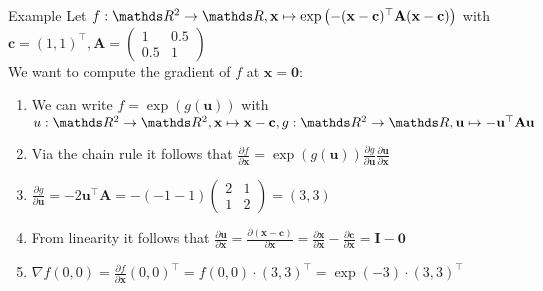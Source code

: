 \documentclass[11pt,compress,t,notes=noshow, xcolor=table]{beamer}
\begin{document}
\begin{vbframe}{Example}
Let  $f:\R^2 \rightarrow \R, \mathbf{x} \mapsto \exp\left(-(\mathbf{x} - \mathbf{c})^\top \mathbf{A} (\mathbf{x} - \mathbf{c})\right)$ with $\mathbf{c} = (1, 1)^\top, \mathbf{A} = \begin{pmatrix}1 & 0.5 \\ 0.5 & 1\end{pmatrix}$\\
We want to compute the gradient of $f$ at $\mathbf{x} = \mathbf{0}:$\\
\medskip
\begin{enumerate}
    \item We can write $f = \exp(g(\mathbf{u}))$ with $u:\R^2\rightarrow\R^2, \mathbf{x}\mapsto \mathbf{x} - \mathbf{c}, g:\R^2\rightarrow\R, \mathbf{u} \mapsto -\mathbf{u}^\top\mathbf{A}\mathbf{u}$
    \item Via the chain rule it follows that $\frac{\partial f}{\partial{\mathbf{x}}} = \exp(g(\mathbf{u}))\frac{\partial g}{\partial\mathbf{u}}\frac{\partial\mathbf{u}}{\partial\mathbf{x}}$
    \item $\frac{\partial g}{\partial\mathbf{u}} = -2\mathbf{u}^\top\mathbf{A} = -(-1 -1)\begin{pmatrix}2 & 1 \\ 1 & 2\end{pmatrix} = (3, 3)$
    \item From linearity it follows that $\frac{\partial\mathbf{u}}{\partial\mathbf{x}} = \frac{\partial(\mathbf{x} - \mathbf{c})}{\partial\mathbf{x}} = \frac{\partial\mathbf{x}}{\partial\mathbf{x}} - \frac{\partial\mathbf{c}}{\partial\mathbf{x}} = \mathbf{I} - \mathbf{0}$
    \item $\nabla f (0, 0) = \frac{\partial f}{\partial{\mathbf{x}}}(0, 0)^\top = f(0,0) \cdot (3, 3)^\top = \exp(-3) \cdot (3, 3)^\top$
\end{enumerate}

\end{vbframe}

\endlecture
\end{document}
